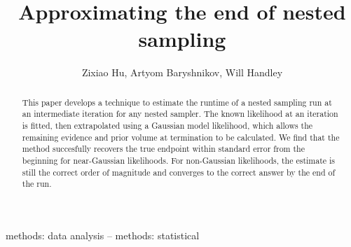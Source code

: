 \documentclass[usenatbib]{mnras}
\title[Approximating the end of nested sampling]{Approximating the end of nested sampling}
\author[Z. Hu et. al]{Zixiao Hu, Artyom Baryshnikov, Will Handley}
\begin{document}
\label{firstpage}
\pagerange{\pageref{firstpage}--\pageref{lastpage}}
\maketitle


\begin{abstract}
This paper develops a technique to estimate the runtime of a nested sampling run at an intermediate iteration for any nested sampler. The known likelihood at an iteration is fitted, then extrapolated using a Gaussian model likelihood, which allows the remaining evidence and prior volume at termination to be calculated. We find that the method succesfully recovers the true endpoint within standard error from the beginning for near-Gaussian likelihoods. For non-Gaussian likelihoods, the estimate is still the correct order of magnitude and converges to the correct answer by the end of the run. 
\end{abstract}

\begin{keywords}
methods: data analysis -- methods: statistical
\end{keywords}
\end{document}
